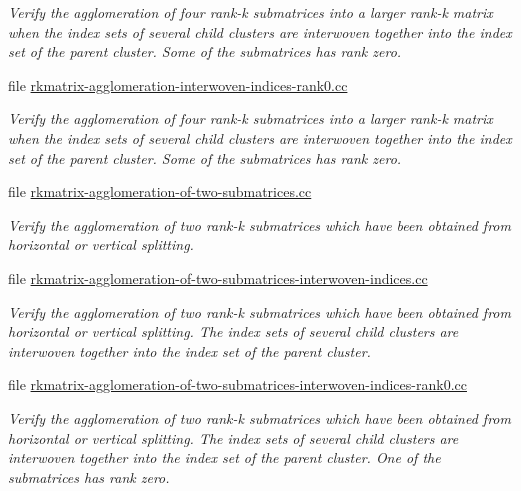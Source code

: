 \begin{DoxyCompactItemize}
\begin{DoxyCompactList}\small\item\em Verify the agglomeration of four rank-\/k submatrices into a larger rank-\/k matrix when the index sets of several child clusters are interwoven together into the index set of the parent cluster. Some of the submatrices has rank zero. \end{DoxyCompactList}\item 
file \hyperlink{rkmatrix-agglomeration-interwoven-indices-rank0_8cc}{rkmatrix-\/agglomeration-\/interwoven-\/indices-\/rank0.\+cc}
\begin{DoxyCompactList}\small\item\em Verify the agglomeration of four rank-\/k submatrices into a larger rank-\/k matrix when the index sets of several child clusters are interwoven together into the index set of the parent cluster. Some of the submatrices has rank zero. \end{DoxyCompactList}\item 
file \hyperlink{rkmatrix-agglomeration-of-two-submatrices_8cc}{rkmatrix-\/agglomeration-\/of-\/two-\/submatrices.\+cc}
\begin{DoxyCompactList}\small\item\em Verify the agglomeration of two rank-\/k submatrices which have been obtained from horizontal or vertical splitting. \end{DoxyCompactList}\item 
file \hyperlink{rkmatrix-agglomeration-of-two-submatrices-interwoven-indices_8cc}{rkmatrix-\/agglomeration-\/of-\/two-\/submatrices-\/interwoven-\/indices.\+cc}
\begin{DoxyCompactList}\small\item\em Verify the agglomeration of two rank-\/k submatrices which have been obtained from horizontal or vertical splitting. The index sets of several child clusters are interwoven together into the index set of the parent cluster. \end{DoxyCompactList}\item 
file \hyperlink{rkmatrix-agglomeration-of-two-submatrices-interwoven-indices-rank0_8cc}{rkmatrix-\/agglomeration-\/of-\/two-\/submatrices-\/interwoven-\/indices-\/rank0.\+cc}
\begin{DoxyCompactList}\small\item\em Verify the agglomeration of two rank-\/k submatrices which have been obtained from horizontal or vertical splitting. The index sets of several child clusters are interwoven together into the index set of the parent cluster. One of the submatrices has rank zero. \end{DoxyCompactList}\item 

\end{DoxyCompactItemize}
